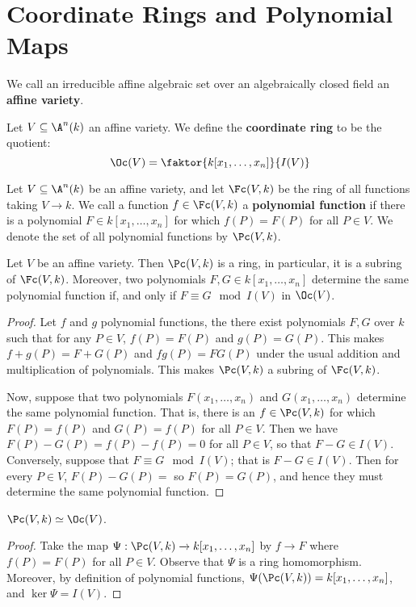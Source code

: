 \section{Coordinate Rings and Polynomial Maps}\label{section_2.1}

\begin{definition}
  We call an irreducible affine algebraic set over an algebraically closed field
  an \textbf{affine variety}.
\end{definition}

\begin{definition}
  Let $V \subseteq \A^n(k)$ an affine variety. We define the \textbf{coordinate
  ring} to be the quotient:
  \begin{equation*}
    \Oc(V)=\faktor{k[x_1, \dots, x_n]}{I(V)}
  \end{equation*}
\end{definition}

\begin{definition}
  Let $V \subseteq \A^n(k)$ be an affine variety, and let $\Fc(V,k)$ be the ring
  of all functions taking $V \xrightarrow{} k$. We call a function $f \in
  \Fc(V,k)$ a \textbf{polynomial function} if there is a polynomial $F \in
  k[x_1, \dots, x_n]$ for which $f(P)=F(P)$ for all $P \in V$. We denote the set
  of all polynomial functions by $\Pc(V,k)$.
\end{definition}

\begin{proposition}\label{proposition_2.1.1}
  Let $V$ be an affine variety. Then $\Pc(V,k)$ is a ring, in particular, it is
  a subring of $\Fc(V,k)$. Moreover, two polynomials $F,G \in k[x_1, \dots,
  x_n]$ determine the same polynomial function if, and only if $F \equiv G
  \mod{I(V)}$ in $\Oc(V)$.
\end{proposition}
\begin{proof}
  Let $f$ and  $g$ polynomial functions, the there exist polynomials $F,G$ over
  $k$ such that for any  $P \in V$, $f(P)=F(P)$ and $g(P)=G(P)$. This makes
  $f+g(P)=F+G(P)$ and $fg(P)=FG(P)$ under the usual addition and multiplication
  of polynomials. This makes $\Pc(V,k)$ a subring of $\Fc(V,k)$.

  Now, suppose that two polynomials $F(x_1, \dots, x_n)$ and $G(x_1, \dots,
  x_n)$ determine the same polynomial function. That is, there is an $f \in
  \Pc(V,k)$ for which $F(P)=f(P)$ and $G(P)=f(P)$ for all $P \in V$. Then we
  have $F(P)-G(P)=f(P)-f(P)=0$ for all $P \in V$, so that $F-G \in I(V)$.
  Conversely, suppose that $F \equiv G \mod{I(V)}$; that is $F-G \in I(V)$. Then
  for every $P \in V$, $F(P)-G(P)=$ so $F(P)=G(P)$, and hence they must
  determine the same polynomial function.
\end{proof}
\begin{corollary}
  $\Pc(V,k) \simeq \Oc(V)$.
\end{corollary}
\begin{proof}
  Take the map $\Psi: \Pc(V,k) \xrightarrow{} k[x_1, \dots, x_n]$ by $f
  \xrightarrow{} F$ where $f(P)=F(P)$ for all $P \in V$. Observe that $\Psi$ is
  a ring homomorphism. Moreover, by definition of polynomial functions,
  $\Psi(\Pc(V,k))=k[x_1, \dots, x_n]$, and $\ker{\Psi}=I(V)$.
\end{proof}

